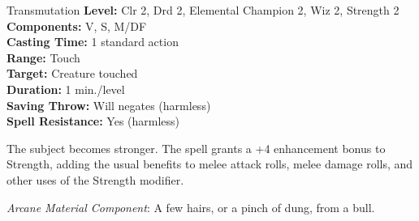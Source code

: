 {Transmutation}
{
	\textbf{Level:}
	Clr 2, Drd 2, Elemental Champion 2, Wiz 2, Strength 2\\
	\textbf{Components:}
	V, S, M/DF\\
	\textbf{Casting Time:}
	1 standard action\\
	\textbf{Range:}
	Touch\\
	\textbf{Target:}
	Creature touched\\
	\textbf{Duration:}
	1 min./level\\
	\textbf{Saving Throw:}
	Will negates (harmless)\\
	\textbf{Spell Resistance:}
	Yes (harmless)\\
}
{
	The subject becomes stronger. The spell grants a +4 enhancement bonus to Strength, adding the usual benefits to melee attack rolls, melee damage rolls, and other uses of the Strength modifier.

	\textit{Arcane Material Component}:
	A few hairs, or a pinch of dung, from a bull.

}
